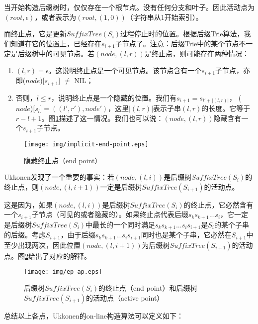 \documentclass[UTF8]{article}
\begin{document}
当开始构造后缀树时，仅仅存在一个根节点。没有任何分支和叶子。因此活动点为$(root, \epsilon)$，或者表示为$(root, (1, 0))$（字符串从1开始索引）。

而终止点，它是更新$SuffixTree(S_i)$过程停止时的位置。根据后缀Trie算法，我们知道在它的\underline{位置}上，已经存在$s_{i+1}$子节点了。注意：后缀Trie中的某个节点不一定是后缀树中的可见节点。若$(node, (l, r))$是终止点，则可能存在两种情况：

\begin{enumerate}
\item $(l, r)=\epsilon$。这说明终止点是一个可见节点。该节点含有一个$s_{i+1}$子节点，亦即($node$)[$s_{i+1}$] $\neq$ NIL；
\item 否则，$l \leq r$，说明终止点是一个隐藏的位置。我们有$s_{i+1}=s_{l'+|(l, r)|}$，
($node$)[$s_l$]$=((l', r'), node')$，这里$|(l, r)|$表示子串$(l, r)$的长度。它等于$r-l+1$。图\ref{fig:implicit-end-point}描述了这一情况。我们也可以说：$(node, (l, r))$隐藏含有一个$s_{i+1}$子节点。
\end{enumerate}

\begin{figure}[htbp]
  \centering
  \texttt{[image: img/implicit-end-point.eps]}
  \caption{隐藏终止点（end point）}
  \label{fig:implicit-end-point}
\end{figure}

Ukkonen发现了一个重要的事实：若$(node, (l, i))$是后缀树$SuffixTree(S_i)$的终止点，则$(node, (l, i+1))$一定是后缀树$SuffixTree(S_{i+1})$的活动点。

这是因为，如果$(node, (l, i))$是后缀树$SuffixTree(S_i)$的终止点，它必然含有一个$s_{i+1}$子节点（可见的或者隐藏的）。如果终止点代表后缀$s_ks_{k+1}...s_i$，它一定是后缀树$SuffixTree(S_i)$中最长的一个同时满足$s_ks_{k+1}...s_is_{i+1}$是$S_i$的某个子串的后缀。考虑$S_{i+1}$，由于后缀$s_ks_{k+1}...s_is_{i+1}$同时也是某个子串，它必然在$S_{i+1}$中至少出现两次，因此位置$(node, (l, i+1))$为后缀树$SuffixTree(S_{i+1})$的活动点。图\ref{fig:ep-ap}给出了对应的解释。

\begin{figure}[htbp]
  \centering
  \texttt{[image: img/ep-ap.eps]}
  \caption{后缀树$SuffixTree(S_i)$的终止点（end point）和后缀树$SuffixTree(S_{i+1})$的活动点（active point）}
  \label{fig:ep-ap}
\end{figure}

总结以上各点，Ukkonen的on-line构造算法可以定义如下：
\end{document}
